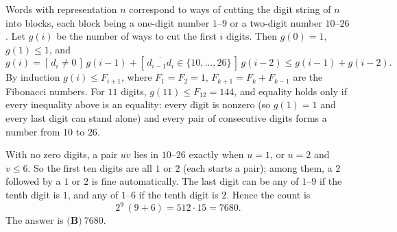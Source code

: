 Words with representation $n$ correspond to ways of cutting the digit string of $n$ into blocks, each block being a one-digit number $1$--$9$ or a two-digit number $10$--$26$. Let $g(i)$ be the number of ways to cut the first $i$ digits. Then $g(0)=1$, $g(1)\le1$, and
\[
g(i)=[\,d_i\ne0\,]\,g(i-1)+[\,\overline{d_{i-1}d_i}\in\{10,\dots,26\}\,]\,g(i-2)\le g(i-1)+g(i-2).
\]
By induction $g(i)\le F_{i+1}$, where $F_1=F_2=1$, $F_{k+1}=F_k+F_{k-1}$ are the Fibonacci numbers. For $11$ digits, $g(11)\le F_{12}=144$, and equality holds only if every inequality above is an equality: every digit is nonzero (so $g(1)=1$ and every last digit can stand alone) and every pair of consecutive digits forms a number from $10$ to $26$.

With no zero digits, a pair $\overline{uv}$ lies in $10$--$26$ exactly when $u=1$, or $u=2$ and $v\le6$. So the first ten digits are all $1$ or $2$ (each starts a pair); among them, a $2$ followed by a $1$ or $2$ is fine automatically. The last digit can be any of $1$--$9$ if the tenth digit is $1$, and any of $1$--$6$ if the tenth digit is $2$. Hence the count is
\[
2^9\,(9+6)=512\cdot15=7680 .
\]
The answer is $\boxed{\textbf{(B)}\ 7680}$.
